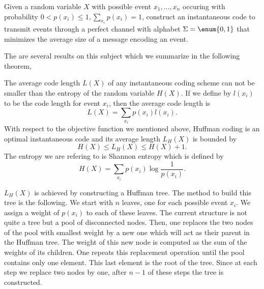 \begin{problem}
Given a random variable \(X\) with possible event \(x_1,\ldots,x_n\) occuring
with probability \(0 < p(x_i) \le 1, \sum_{x_i} p(x_i) = 1\), construct an
instantaneous code to transmit events through a perfect channel with alphabet
\(\Sigma = \enum{0,1}\) that minimizes the average size of a message encoding
an event.
\end{problem}

The are several results on this subject which we summarize in the
following theorem,

\begin{theorem}
The average code length \(L(X)\) of any instantaneous coding scheme can not be smaller than
the entropy of the random variable \(H(X)\). If we define by \(l(x_i)\) to be the code
length for event \(x_i\), then the average code length is
\begin{displaymath}
L(X) = \sum_{x_i} p(x_i) l(x_i).
\end{displaymath}
With respect to the objective function we mentioned above, Huffman coding is
an optimal instantaneous code and its average length \(L_H(X)\) is bounded by
\begin{displaymath}
H(X) \le L_H(X) \le H(X) + 1.
\end{displaymath}
The entropy we are refering to is Shannon entropy which is defined by
\begin{displaymath}
H(X) = \sum_{x_i} p(x_i) \log \frac{1}{p(x_i)}.
\end{displaymath}
\end{theorem}

\(L_H(X)\) is achieved by constructing a Huffman tree. The method to build this
tree is the following. We start with \(n\) leaves, one for each possible event
\(x_i\). We assign a weight of \(p(x_i)\) to each of these leaves. The current
structure is not quite a tree but a pool of disconnected nodes.  Then, one
replaces the two nodes of the pool with smallest weight by a new one which will
act as their parent in the Huffman tree. The weight of this new node is
computed as the sum of the weights of its children. One repeats this
replacement operation until the pool contains only one element. This last
element is the root of the tree. Since at each step we replace two nodes by
one, after \(n-1\) of these steps the tree is constructed.

